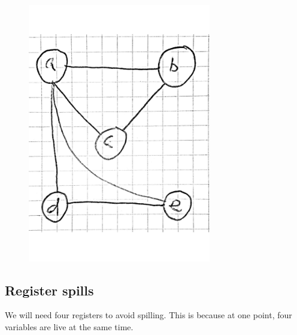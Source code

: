 \documentclass[paper=a4, fontsize=11pt]{scrartcl} %
\numberwithin{equation}{section} %
\numberwithin{figure}{section} %
\numberwithin{table}{section} %
\begin{document}
\begin{figure}[ht!]
\centering
\includegraphics[width=80mm]{4c.pdf}
\end{figure}

\subsection{Register spills}

We will need four registers to avoid spilling. This is because at one point, four variables are live at the same time.
\end{document}
